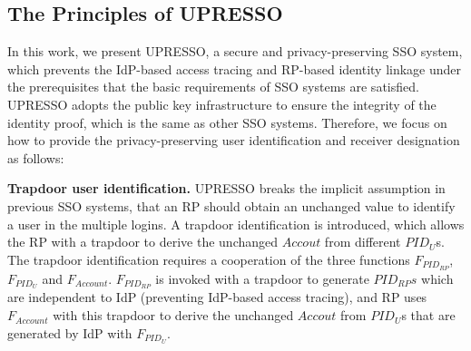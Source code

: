 \subsection{The Principles of UPRESSO}
\label{subsec:solutions}
In this work, we present UPRESSO, a secure and privacy-preserving SSO system, %
which prevents the IdP-based access tracing and RP-based identity linkage under the prerequisites that  the basic requirements of SSO systems are satisfied.
UPRESSO adopts the public key infrastructure to ensure the integrity of the identity proof, which is the same as other SSO systems.
Therefore, we focus on how to provide the privacy-preserving user identification and receiver designation as follows:


\vspace{1mm}\noindent \textbf{Trapdoor user identification.} UPRESSO breaks the implicit assumption in previous SSO systems, that an RP should obtain an unchanged value to identify a user in the multiple logins.
A trapdoor identification is introduced, which allows the RP with a trapdoor to derive the unchanged $Accout$ from different $PID_{U}$s.
The trapdoor identification requires a cooperation of the three functions $F_{PID_{RP}}$, $F_{PID_{U}}$ and $F_{Account}$.
$F_{PID_{RP}}$  is invoked with a trapdoor to generate $PID_{RP}s$ which are independent to IdP (preventing IdP-based access tracing),
 and RP uses $F_{Account}$ with this trapdoor to derive the unchanged $Accout$  from $PID_{U}$s that are generated by IdP with $F_{PID_{U}}$.

